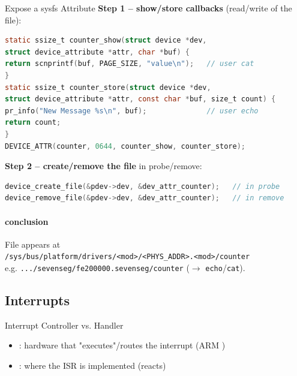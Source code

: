 \begin{KR}{Expose a sysfs Attribute}
    \textbf{Step 1 -- show/store callbacks} (read/write of the file):
\begin{lstlisting}[language=C, style=basesmol, aboveskip=2pt, belowskip=2pt]
static ssize_t counter_show(struct device *dev,
struct device_attribute *attr, char *buf) {
return scnprintf(buf, PAGE_SIZE, "value\n");   // user cat
}
static ssize_t counter_store(struct device *dev,
struct device_attribute *attr, const char *buf, size_t count) {
pr_info("New Message %s\n", buf);              // user echo
return count;
}
DEVICE_ATTR(counter, 0644, counter_show, counter_store);
\end{lstlisting}
    \textbf{Step 2 -- create/remove the file} in probe/remove:
\begin{lstlisting}[language=C, style=basesmol, aboveskip=2pt, belowskip=2pt]
device_create_file(&pdev->dev, &dev_attr_counter);   // in probe
device_remove_file(&pdev->dev, &dev_attr_counter);   // in remove
\end{lstlisting}
    \paragraph{conclusion}
    File appears at\\
    \texttt{/sys/bus/platform/drivers/<mod>/<PHYS\_ADDR>.<mod>/counter}\\
    e.g. \texttt{.../sevenseg/fe200000.sevenseg/counter} ($\to$ \texttt{echo}/\texttt{cat}).
\end{KR}

\subsection{Interrupts}


\begin{concept}{Interrupt Controller vs. Handler}
    \begin{itemize}
        \item {}: hardware that "executes"/routes the
              interrupt (ARM )
        \item {}: where the ISR is implemented (reacts)
    \end{itemize}
\end{concept}

